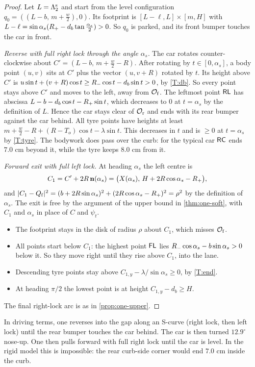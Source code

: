\begin{proof}
Let $L=\Lambda_2^{\rm s}$ and start from the level configuration $q_0=((L-b,\,m+\tfrac w2),0)$.
Its footprint is $[L-\ell,L]\times[m,H]$ with $L-\ell=\sin\alpha_s(R_{+}-d_b\tan\tfrac{\alpha_s}2)>0$.
So $q_0$ is parked, and its front bumper touches the car in front.

\emph{Reverse with full right lock through the angle $\alpha_s$.}
The car rotates counter-clockwise about $C'=(L-b,\,m+\tfrac w2-R)$.
After rotating by $t\in[0,\alpha_s]$, a body point $(u,v)$ sits at $C'$ plus the vector $(u,v+R)$ rotated by $t$.
Its height above $C'$ is $u\sin t+(v+R)\cos t\ge R_{-}\cos t-d_b\sin t>0$, by \ref{T:db}.
So every point stays above $C'$ and moves to the left, away from $\mathcal{O}_{\mathrm f}$.
The leftmost point $\mathsf{RL}$ has abscissa $L-b-d_b\cos t-R_{+}\sin t$, which decreases to $0$ at $t=\alpha_s$ by the definition of $L$.
Hence the car stays clear of $\mathcal{O}_{\mathrm r}$ and ends with its rear bumper against the car behind.
All tyre points have heights at least $m+\tfrac w2-R+(R-T_o)\cos t-\lambda\sin t$.
This decreases in $t$ and is $\ge0$ at $t=\alpha_s$ by \ref{T:tyre}.
The bodywork does pass over the curb: for the typical car $\mathsf{RC}$ ends $7.0$ cm beyond it, while the tyre keeps $8.0$ cm from it.

\emph{Forward exit with full left lock.}
At heading $\alpha_s$ the left centre is
\[
  C_1=C'+2R\,\mathbf{n}(\alpha_s)=\big(X(\alpha_s),\,H+2R\cos\alpha_s-R_{+}\big),
\]
and $|C_1-Q_{\mathrm f}|^2=(b+2R\sin\alpha_s)^2+(2R\cos\alpha_s-R_{+})^2=\rho^2$ by the definition of $\alpha_s$.
The exit is free by the argument of the upper bound in \cref{thm:one-soft}, with $C_1$ and $\alpha_s$ in place of $C$ and $\psi_t$.
\begin{itemize}[nosep]
\item The footprint stays in the disk of radius $\rho$ about $C_1$, which misses $\mathcal{O}_{\mathrm f}$.
\item All points start below $C_1$: the highest point $\mathsf{FL}$ lies $R_{-}\cos\alpha_s-b\sin\alpha_s>0$ below it. So they move right until they rise above $C_1$, into the lane.
\item Descending tyre points stay above $C_{1,y}-\lambda/\sin\alpha_s\ge0$, by \ref{T:end}.
\item At heading $\pi/2$ the lowest point is at height $C_{1,y}-d_b\ge H$.
\end{itemize}
The final right-lock arc is as in \cref{prop:one-upper}.
\end{proof}

In driving terms, one reverses into the gap along an S-curve (right lock, then left lock) until the rear bumper touches the car behind.
The car is then turned $12.9^\circ$ nose-up.
One then pulls forward with full right lock until the car is level.
In the rigid model this is impossible: the rear curb-side corner would end $7.0$ cm inside the curb.

